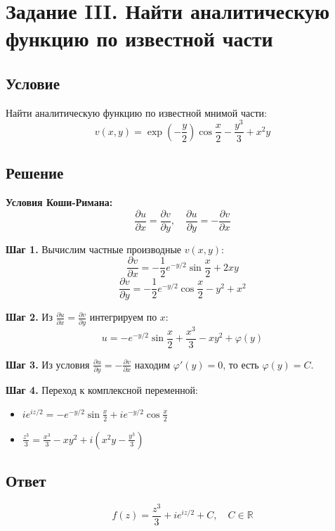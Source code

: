 \documentclass[12pt,a4paper]{article}
\begin{document}
\newpage
\section{Задание III.  Найти аналитическую функцию по известной части}

\subsection{Условие}
Найти аналитическую функцию по известной мнимой части:
\[
v(x, y) = \exp\left(-\frac{y}{2}\right) \cos\frac{x}{2} - \frac{y^3}{3} + x^2 y
\]

\subsection{Решение}

\textbf{Условия Коши-Римана:}
\[
\frac{\partial u}{\partial x} = \frac{\partial v}{\partial y}, \quad \frac{\partial u}{\partial y} = -\frac{\partial v}{\partial x}
\]

\textbf{Шаг 1.} Вычислим частные производные $v(x,y)$:
\[
\frac{\partial v}{\partial x} = -\frac{1}{2}e^{-y/2}\sin\frac{x}{2} + 2xy
\]
\[
\frac{\partial v}{\partial y} = -\frac{1}{2}e^{-y/2}\cos\frac{x}{2} - y^2 + x^2
\]

\textbf{Шаг 2.} Из $\frac{\partial u}{\partial x} = \frac{\partial v}{\partial y}$ интегрируем по $x$:
\[
u = -e^{-y/2}\sin\frac{x}{2} + \frac{x^3}{3} - xy^2 + \varphi(y)
\]

\textbf{Шаг 3. } Из условия $\frac{\partial u}{\partial y} = -\frac{\partial v}{\partial x}$ находим $\varphi'(y) = 0$, то есть $\varphi(y) = C$. 

\textbf{Шаг 4.} Переход к комплексной переменной:
\begin{itemize}
    \item $ie^{iz/2} = -e^{-y/2}\sin\frac{x}{2} + ie^{-y/2}\cos\frac{x}{2}$
    \item $\frac{z^3}{3} = \frac{x^3}{3} - xy^2 + i\left(x^2y - \frac{y^3}{3}\right)$
\end{itemize}

\subsection{Ответ}
\[
\boxed{f(z) = \frac{z^3}{3} + ie^{iz/2} + C, \quad C \in \mathbb{R}}
\]
\end{document}
